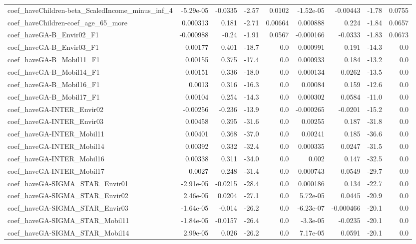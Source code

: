 \begin{tabular}{lrrrrrrrr}
coef_haveChildren-beta_ScaledIncome_minus_inf_4 & -5.29e-05 & -0.0335 & -2.57 & 0.0102 & -1.52e-05 & -0.00443 & -1.78 & 0.0755 \\
coef_haveChildren-coef_age_65_more & 0.000313 & 0.181 & -2.71 & 0.00664 & 0.000888 & 0.224 & -1.84 & 0.0657 \\
coef_haveGA-B_Envir02_F1 & -0.000988 & -0.24 & -1.91 & 0.0567 & -0.000166 & -0.0333 & -1.83 & 0.0673 \\
coef_haveGA-B_Envir03_F1 & 0.00177 & 0.401 & -18.7 & 0.0 & 0.000991 & 0.191 & -14.3 & 0.0 \\
coef_haveGA-B_Mobil11_F1 & 0.00155 & 0.375 & -17.4 & 0.0 & 0.000933 & 0.184 & -13.2 & 0.0 \\
coef_haveGA-B_Mobil14_F1 & 0.00151 & 0.336 & -18.0 & 0.0 & 0.000134 & 0.0262 & -13.5 & 0.0 \\
coef_haveGA-B_Mobil16_F1 & 0.0013 & 0.316 & -16.3 & 0.0 & 0.00084 & 0.159 & -12.6 & 0.0 \\
coef_haveGA-B_Mobil17_F1 & 0.00104 & 0.254 & -14.3 & 0.0 & 0.000302 & 0.0584 & -11.0 & 0.0 \\
coef_haveGA-INTER_Envir02 & -0.00256 & -0.236 & -13.9 & 0.0 & -0.000265 & -0.0201 & -15.2 & 0.0 \\
coef_haveGA-INTER_Envir03 & 0.00458 & 0.395 & -31.6 & 0.0 & 0.00255 & 0.187 & -31.8 & 0.0 \\
coef_haveGA-INTER_Mobil11 & 0.00401 & 0.368 & -37.0 & 0.0 & 0.00241 & 0.185 & -36.6 & 0.0 \\
coef_haveGA-INTER_Mobil14 & 0.00392 & 0.332 & -32.4 & 0.0 & 0.000335 & 0.0247 & -31.5 & 0.0 \\
coef_haveGA-INTER_Mobil16 & 0.00338 & 0.311 & -34.0 & 0.0 & 0.002 & 0.147 & -32.5 & 0.0 \\
coef_haveGA-INTER_Mobil17 & 0.0027 & 0.248 & -31.4 & 0.0 & 0.000743 & 0.0549 & -29.7 & 0.0 \\
coef_haveGA-SIGMA_STAR_Envir01 & -2.91e-05 & -0.0215 & -28.4 & 0.0 & 0.000186 & 0.134 & -22.7 & 0.0 \\
coef_haveGA-SIGMA_STAR_Envir02 & 2.46e-05 & 0.0204 & -27.1 & 0.0 & 5.72e-05 & 0.0445 & -20.9 & 0.0 \\
coef_haveGA-SIGMA_STAR_Envir03 & -1.64e-05 & -0.014 & -26.2 & 0.0 & -6.23e-07 & -0.000466 & -20.1 & 0.0 \\
coef_haveGA-SIGMA_STAR_Mobil11 & -1.84e-05 & -0.0157 & -26.4 & 0.0 & -3.3e-05 & -0.0235 & -20.1 & 0.0 \\
coef_haveGA-SIGMA_STAR_Mobil14 & 2.99e-05 & 0.026 & -26.2 & 0.0 & 7.17e-05 & 0.0591 & -20.1 & 0.0 \\

\end{tabular}
